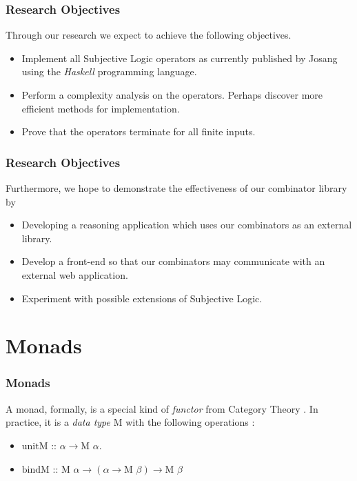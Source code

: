 \documentclass{beamer}
\begin{document}
\begin{frame}
\frametitle{Research Objectives}

Through our research we expect to achieve the following objectives.

\begin{itemize}
  \item Implement all Subjective Logic operators as currently published by Josang
    using the \emph{Haskell} programming language.
  \item Perform a complexity analysis on the operators. Perhaps discover more efficient
    methods for implementation.
  \item Prove that the operators terminate for all finite inputs.
\end{itemize}

\end{frame}


\begin{frame}
\frametitle{Research Objectives}

Furthermore, we hope to demonstrate the effectiveness of our combinator
library by

\begin{itemize}
  \item Developing a reasoning application which uses our combinators as an
    external library.
  \item Develop a front-end so that our combinators may communicate
    with an external web application.
  \item Experiment with possible extensions of Subjective Logic.
\end{itemize}

\end{frame}

%
%

\section{Monads}

\begin{frame}
\frametitle{Monads}

A monad, formally, is a special kind of \emph{functor} from Category Theory \cite{mac1998categories}. In
practice, it is a \emph{data type} M with the following operations \cite{Wadler:1992:EFP:143165.143169}:

\begin{itemize}
  \item $\mbox{unitM :: } \alpha \rightarrow \mbox{M } \alpha$.
  \item $\mbox{bindM :: } \mbox{M } \alpha \rightarrow \left(\alpha \rightarrow \mbox{M } \beta\right) \rightarrow \mbox{M } \beta$
\end{itemize}

\end{frame}
\end{document}

